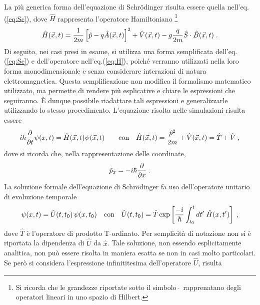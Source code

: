\documentclass[12pt]{report}
\begin{document}
La più generica forma dell'equazione di Schr\"odinger risulta essere quella nell'eq.(\ref{eq:Sc}), dove $\hat{H}$ rappresenta l'operatore Hamiltoniano  \footnote{Si ricorda che le grandezze riportate sotto il simbolo $\, \hat{ } \,$ rapprenatano degli operatori lineari in uno spazio di Hilbert.}
\begin{equation}
    \centering
    \hat{H} (\vec{x}, t) = \frac{1}{2m} \left[\hat{p} - q \hat{A}(\vec{x}, t) \right]^2 + \hat{V}(\vec{x}, t) - g \frac{q}{2m} \hat{S} \cdot \hat{B}(\vec{x},t) \; \text{.}
    \label{eq:H}
\end{equation}
Di seguito, nei casi presi in esame, si utilizza una forma semplificata dell'eq.(\ref{eq:Sc}) e dell'operatore nell'eq.(\ref{eq:H}), poiché verranno utilizzati nella loro forma monodimensionale e senza considerare interazioni di natura elettromagnetica. Questa semplificazione non modifica il formalismo matematico utilizzato, ma permette di rendere più esplicative e chiare le espressioni che seguiranno. È dunque possibile riadattare tali espressioni e generalizzarle utilizzando lo stesso procedimento. L'equazione risolta nelle simulazioni risulta essere
\begin{equation}
    \centering
    i \hbar \frac{\partial}{\partial t} \psi (x, t) =  \hat{H} (\vec{x}, t) \psi (\vec{x}, t)   \qquad \text{con} \quad \hat{H} (\vec{x}, t) = \frac{\hat{p}^2}{2m}  + \hat{V}(\vec{x}, t) = \hat{T} + \hat{V} \; \text{,}
    \label{eq:Sc_1D}
\end{equation}
dove si ricorda che, nella rappresentazione delle coordinate, 
\begin{equation}
    \centering
    \hat{p}_{x} = - i \hbar \frac{\partial } {\partial x} \; \text{.}
    \label{eq:p}
\end{equation}
La soluzione formale dell'equazione di Schr\"odinger fa uso dell'operatore unitario di evoluzione temporale 
\begin{equation}
    \centering
    \psi (x,t) = \hat{U}(t, t_{0}) \, \psi (x, t_0) \quad \text{con} \quad \hat{U}(t, t_{0}) = \hat{T}  \exp \left[\frac{-i}{\hbar} \int _{t_{0}} ^{t} dt' \; \hat{H}(x,t') \right] \; \text{,}
    \label{eq:U}
\end{equation}
dove $\hat{T}$ è l'operatore di prodotto T-ordinato. Per semplicità di notazione non si è riportata la dipendenza di $\hat{U}$ da $\hat{x}$. 
Tale soluzione, non essendo esplicitamente analitica, non può essere risolta in maniera esatta se non in casi molto particolari.
Se però si considera l'espressione infinititesima dell'operatore $\hat{U}$, risulta
\end{document}
